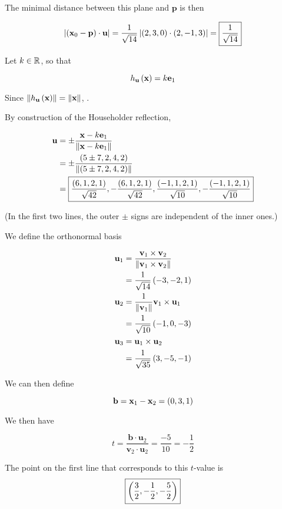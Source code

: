 \documentclass{article}
\begin{document}
The minimal distance between this plane and $\bm{p}$ is then

$$
\left\lvert \left ( \textbf{x}_0 - \textbf{p} \right) \cdot \textbf{u} \right\rvert = \frac{1}{\sqrt{14}} \left\lvert \left ( 2, 3, 0 \right) \cdot \left ( 2, -1, 3 \right) \right\rvert = \boxed{\frac{1}{\sqrt{14}}}
$$



Let $k \in \mathbb R$, so that

$$
h_{\textbf{u}} \left ( \textbf{x} \right) = k \textbf{e}_1
$$

Since $\left\lVert h_{\textbf{u}} \left ( \textbf{x} \right)\right\rVert = \left\lVert\textbf{x}\right\rVert$, .

By construction of the Householder reflection,

\begin{align*}
  \textbf{u} &= \pm \frac{\textbf{x} - k \textbf{e}_1 }{\left\lVert\textbf{x} - k \textbf{e}_1\right\rVert} \\
         &= \pm \frac{\left ( 5 \pm 7, 2, 4, 2 \right)}{\left\lVert\left ( 5 \pm 7, 2, 4, 2 \right)\right\rVert} \\
  &= \boxed{\frac{\left ( 6, 1, 2, 1 \right)}{\sqrt{42}}, -\frac{\left ( 6, 1, 2, 1 \right)}{\sqrt{42}}, \frac{\left ( -1, 1, 2, 1 \right)}{\sqrt{10}}, - \frac{\left ( -1, 1, 2, 1 \right)}{\sqrt{10}} }\\
\end{align*}

(In the first two lines, the outer $\pm$ signs are independent of the inner ones.)

We define the orthonormal basis

\begin{align*}
  \textbf{u}_1 &= \frac{\textbf{v}_1 \times \textbf{v}_2}{\left\lVert\textbf{v}_1 \times \textbf{v}_2\right\rVert} \\
           &= \frac{1}{\sqrt{14}}\left ( -3, -2, 1 \right) \\
  \textbf{u}_2 &= \frac{1}{\left\lVert\textbf{v}_1\right\rVert} \textbf{v}_1 \times \textbf{u}_1 \\
           &= \frac{1}{ \sqrt{10}} \left ( -1, 0, -3 \right) \\
  \textbf{u}_3 &= \textbf{u}_1 \times \textbf{u}_2 \\
           &= \frac{1}{\sqrt{35}} \left ( 3, -5, -1 \right) \\
\end{align*}

We can then define

$$
\textbf{b} = \textbf{x}_1 - \textbf{x}_2 = \left ( 0, 3, 1 \right)
$$

We then have

$$
t = \frac{\bm{b} \cdot \bm{u}_2}{\bm{v}_2 \cdot \bm{u}_2} = \frac{-5}{10} = - \frac{1}{2}
$$

The point on the first line that corresponds to this $t$-value is
$$
\boxed{\left ( \frac{3}{2}, -\frac{1}{2}, -\frac{5}{2} \right)}
$$
\end{document}
